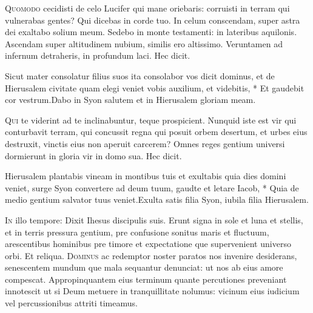 \begin{multicols*}{2}
\begin{responsory}
\end{responsory}
\lettrine[lines=2]{\zallmancaps \color{Red} Q}{uomodo} cecidisti de celo Lucifer qui mane oriebaris: corruisti in terram qui vulnerabas gentes? Qui dicebas in corde tuo. In celum conscendam, super astra dei exaltabo solium meum. Sedebo in monte testamenti: in lateribus aquilonis. Ascendam super altitudinem nubium, similis ero altissimo. Veruntamen ad infernum detraheris, in profundum laci. Hec dicit.
\begin{responsory}
{Sicut mater consolatur filius suos ita consolabor vos dicit dominus, et de Hierusalem civitate quam elegi veniet vobis auxilium, et videbitis, * Et gaudebit cor vestrum.}{Dabo in Syon salutem et in Hierusalem gloriam meam.}
\end{responsory}
\lettrine[lines=2]{\zallmancaps \color{Blue} Q}{ui} te viderint ad te inclinabuntur, teque prospicient. Nunquid iste est vir qui conturbavit terram, qui concussit regna qui posuit orbem desertum, et urbes eius destruxit, vinctis eius non aperuit carcerem? Omnes reges gentium universi dormierunt in gloria vir in domo sua. Hec dicit.
\begin{responsory-doxology}
{Hierusalem plantabis vineam in montibus tuis et exultabis quia dies domini veniet, surge Syon convertere ad deum tuum, gaudte et letare Iacob, * Quia de medio gentium salvator tuus veniet.}{Exulta satis filia Syon, iubila filia Hierusalem.}
\end{responsory-doxology}
\lettrine[lines=2]{\zallmancaps \color{Red} I}{n} illo tempore: Dixit Ihesus discipulis suis. Erunt signa in sole et luna et stellis, et in terris pressura gentium, pre confusione sonitus maris et fluctuum, arescentibus hominibus pre timore et expectatione que supervenient universo orbi. Et reliqua.
 
\lettrine[lines=2]{\zallmancaps \color{Blue} D}{ominus} ac redemptor noster paratos nos invenire desiderans, senescentem mundum que mala sequantur denunciat: ut nos ab eius amore compescat. Appropinquantem eius terminum quante percutiones preveniant innotescit ut si Deum metuere in tranquillitate nolumus: vicinum eius iudicium vel percussionibus attriti timeamus.

\end{multicols*}

